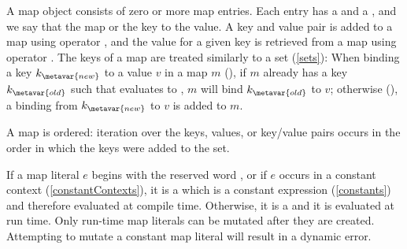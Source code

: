 \documentclass[makeidx]{article}
\begin{document}
{\LMHash{}%
A map object consists of zero or more map entries.
Each entry has a  and a ,
and we say that the map
 or
the key to the value.
A key and value pair is
added to a map using operator \lit{[]=},
and the value for a given key is retrieved from a map using operator \lit{[]}.
The keys of a map are treated similarly to a set
(\ref{sets}):
When binding a key $k_{\metavar{new}}$ to a value $v$ in a map $m$
(),
if $m$ already has a key $k_{\metavar{old}}$ such that
 evaluates to \TRUE,
$m$ will bind $k_{\metavar{old}}$ to $v$;
otherwise
(),
a binding from $k_{\metavar{new}}$ to $v$ is added to $m$.

\LMHash{}%
A map is ordered: iteration over the keys, values, or key/value pairs
occurs in the order in which the keys were added to the set.


\LMHash{}%
If a map literal $e$ begins with the reserved word \CONST,
or if $e$ occurs in a constant context
(\ref{constantContexts}),
it is a
which is a constant expression
(\ref{constants})
and therefore evaluated at compile time.
Otherwise, it is a
and it is evaluated at run time.
Only run-time map literals can be mutated after they are created.
Attempting to mutate a constant map literal will result in a dynamic error.


}
\end{document}
